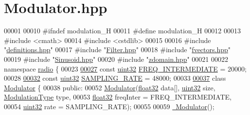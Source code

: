 \hypertarget{Modulator_8hpp_source}{\section{Modulator.\+hpp}
\label{Modulator_8hpp_source}
}

\begin{DoxyCode}
00001 
00010 \textcolor{preprocessor}{#ifndef modulation\_H}
00011 \textcolor{preprocessor}{#define modulation\_H}
00012 
00013 \textcolor{preprocessor}{#include <cmath>}
00014 \textcolor{preprocessor}{#include <cstdlib>}
00015 
00016 \textcolor{preprocessor}{#include "\hyperlink{definitions_8hpp}{definitions.hpp}"}
00017 \textcolor{preprocessor}{#include "\hyperlink{Filter_8hpp}{Filter.hpp}"}
00018 \textcolor{preprocessor}{#include "\hyperlink{fvectors_8hpp}{fvectors.hpp}"}
00019 \textcolor{preprocessor}{#include "\hyperlink{Sinusoid_8hpp}{Sinusoid.hpp}"}
00020 \textcolor{preprocessor}{#include "\hyperlink{zdomain_8hpp}{zdomain.hpp}"}
00021 
00022 \textcolor{keyword}{namespace }\hyperlink{namespaceradio}{radio} \{
00023 
\hypertarget{Modulator_8hpp_source_l00027}{}\hyperlink{namespaceradio_aa82ddc6ba206798fd70ffc25665b3cb6}{00027}     \textcolor{keyword}{const} \hyperlink{definitions_8hpp_a1134b580f8da4de94ca6b1de4d37975e}{uint32} \hyperlink{namespaceradio_aa82ddc6ba206798fd70ffc25665b3cb6}{FREQ\_INTERMEDIATE} = 20000;
00028 
\hypertarget{Modulator_8hpp_source_l00032}{}\hyperlink{namespaceradio_a284213fea4beed2f74bb936927cbe654}{00032}     \textcolor{keyword}{const} \hyperlink{definitions_8hpp_a1134b580f8da4de94ca6b1de4d37975e}{uint32} \hyperlink{namespaceradio_a284213fea4beed2f74bb936927cbe654}{SAMPLING\_RATE} = 48000;
00033 
\hypertarget{Modulator_8hpp_source_l00037}{}\hyperlink{classradio_1_1Modulator}{00037}     \textcolor{keyword}{class }\hyperlink{classradio_1_1Modulator}{Modulator} \{
00038         \textcolor{keyword}{public}:
00052             \hyperlink{classradio_1_1Modulator_ab202651b368986cc76673b6e997550b8}{Modulator}(\hyperlink{definitions_8hpp_aacdc525d6f7bddb3ae95d5c311bd06a1}{float32} data[], \hyperlink{definitions_8hpp_a1134b580f8da4de94ca6b1de4d37975e}{uint32} size, 
      \hyperlink{namespaceradio_a46fb7299001138f28b7f69975c58399e}{ModulationType} type,
00053                     \hyperlink{definitions_8hpp_aacdc525d6f7bddb3ae95d5c311bd06a1}{float32} freqInter = FREQ\_INTERMEDIATE,
00054                     \hyperlink{definitions_8hpp_a1134b580f8da4de94ca6b1de4d37975e}{uint32} rate = SAMPLING\_RATE);
00055 
00059             \hyperlink{classradio_1_1Modulator_a712e6e110c57b29ebdd754bd34bf269b}{~Modulator}();

\end{DoxyCode}
